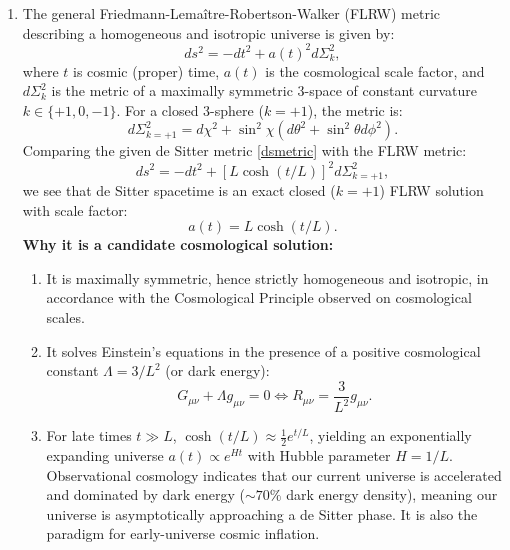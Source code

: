 \documentclass[12pt]{article}
\begin{document}
\begin{enumerate}[label=\alph*)]
\item The general Friedmann-Lema\^itre-Robertson-Walker (FLRW) metric describing a homogeneous and isotropic universe is given by:
\begin{equation}
ds^2 = - dt^2 + a(t)^2 d\Sigma_k^2,
\end{equation}
where $t$ is cosmic (proper) time, $a(t)$ is the cosmological scale factor, and $d\Sigma_k^2$ is the metric of a maximally symmetric 3-space of constant curvature $k \in \{+1, 0, -1\}$. For a closed 3-sphere ($k=+1$), the metric is:
\begin{equation}
d\Sigma_{k=+1}^2 = d\chi^2 + \sin^2\chi (d\theta^2 + \sin^2\theta d\phi^2).
\end{equation}
Comparing the given de Sitter metric \eqref{dsmetric} with the FLRW metric:
\begin{equation}
ds^2 = - dt^2 + \left[ L \cosh(t/L) \right]^2 d\Sigma_{k=+1}^2,
\end{equation}
we see that de Sitter spacetime is an exact closed ($k=+1$) FLRW solution with scale factor:
\begin{equation}
a(t) = L \cosh(t/L).
\end{equation}
\textbf{Why it is a candidate cosmological solution:}\\
\begin{enumerate}[label=(\roman*)]
\item It is maximally symmetric, hence strictly homogeneous and isotropic, in accordance with the Cosmological Principle observed on cosmological scales.
\item It solves Einstein's equations in the presence of a positive cosmological constant $\Lambda = 3/L^2$ (or dark energy):
\begin{equation}
G_{\mu\nu} + \Lambda g_{\mu\nu} = 0 \iff R_{\mu\nu} = \frac{3}{L^2} g_{\mu\nu}.
\end{equation}
\item For late times $t \gg L$, $\cosh(t/L) \approx \frac{1}{2} e^{t/L}$, yielding an exponentially expanding universe $a(t) \propto e^{H t}$ with Hubble parameter $H = 1/L$. Observational cosmology indicates that our current universe is accelerated and dominated by dark energy ($\sim 70\%$ dark energy density), meaning our universe is asymptotically approaching a de Sitter phase. It is also the paradigm for early-universe cosmic inflation.
\end{enumerate}


\end{enumerate}
\end{document}

